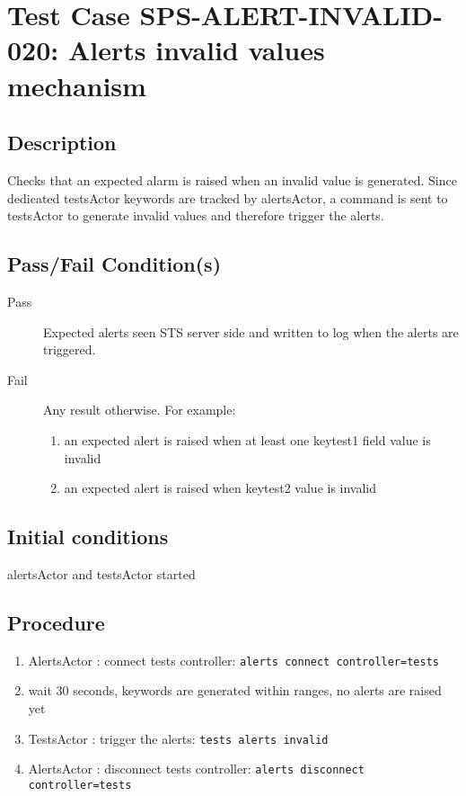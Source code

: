 \section{Test Case SPS-ALERT-INVALID-020: Alerts invalid values mechanism}

\subsection{Description}

Checks that an expected alarm is raised when an invalid value is generated. Since dedicated testsActor keywords are tracked by alertsActor,
a command is sent to testsActor to generate invalid values and therefore trigger the alerts.


\subsection{Pass/Fail Condition(s)}

\begin{description}
\item [Pass] Expected alerts seen STS server side and written to log when the alerts are triggered.
\item [Fail] Any result otherwise. For example:

\begin{enumerate}
    \item an expected alert is raised when at least one keytest1 field value is invalid
    \item an expected alert is raised when keytest2 value is invalid

\end{enumerate}
\end{description}


\subsection{Initial conditions}

alertsActor and testsActor started

\subsection{Procedure}
\label{sec:alerts-proc}

\begin{enumerate}
    \item AlertsActor : connect tests controller: \texttt{alerts connect controller=tests}
    \item wait 30 seconds, keywords are generated within ranges, no alerts are raised yet
    \item TestsActor : trigger the alerts: \texttt{tests alerts invalid}
    \item AlertsActor : disconnect tests controller: \texttt{alerts disconnect controller=tests}
\end{enumerate}
